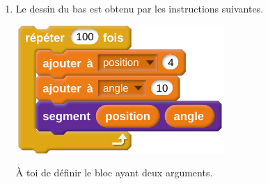 \documentclass[class=report,crop=false, 12pt]{standalone}
\begin{document}
\begin{activite}
\begin{enumerate}
\`A toi de définir le bloc  ayant un argument.

   
 
  \item Le dessin du bas est obtenu par les instructions suivantes.
\begin{center}
  \includegraphics[scale=\scalebloc]{bloc-11-ex3c} 
\end{center} 

\`A toi de définir le bloc  ayant deux arguments.
  
  
\end{enumerate}
  
\end{activite}
\end{document}
